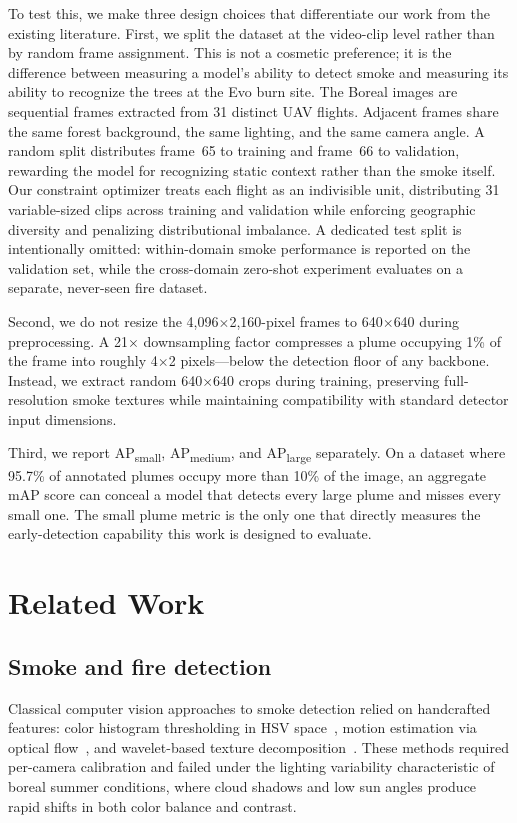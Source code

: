 \documentclass[10pt,twocolumn]{article}
\begin{document}
To test this, we make three design choices that differentiate our work from the existing literature. First, we split the dataset at the video-clip level rather than by random frame assignment. This is not a cosmetic preference; it is the difference between measuring a model's ability to detect smoke and measuring its ability to recognize the trees at the Evo burn site. The Boreal images are sequential frames extracted from 31 distinct UAV flights. Adjacent frames share the same forest background, the same lighting, and the same camera angle. A random split distributes frame~65 to training and frame~66 to validation, rewarding the model for recognizing static context rather than the smoke itself. Our constraint optimizer treats each flight as an indivisible unit, distributing 31 variable-sized clips across training and validation while enforcing geographic diversity and penalizing distributional imbalance. A dedicated test split is intentionally omitted: within-domain smoke performance is reported on the validation set, while the cross-domain zero-shot experiment evaluates on a separate, never-seen fire dataset.

Second, we do not resize the 4,096\(\times\)2,160-pixel frames to 640\(\times\)640 during preprocessing. A 21\(\times\) downsampling factor compresses a plume occupying 1\% of the frame into roughly 4\(\times\)2 pixels---below the detection floor of any backbone. Instead, we extract random 640\(\times\)640 crops during training, preserving full-resolution smoke textures while maintaining compatibility with standard detector input dimensions.

Third, we report AP\textsubscript{small}, AP\textsubscript{medium}, and AP\textsubscript{large} separately. On a dataset where 95.7\% of annotated plumes occupy more than 10\% of the image, an aggregate mAP score can conceal a model that detects every large plume and misses every small one. The small plume metric is the only one that directly measures the early-detection capability this work is designed to evaluate.

\section{Related Work}

\subsection{Smoke and fire detection}

Classical computer vision approaches to smoke detection relied on handcrafted features: color histogram thresholding in HSV space~\cite{toreyin2006fire}, motion estimation via optical flow~\cite{gubbi2009smoke}, and wavelet-based texture decomposition~\cite{toreyin2005wavelet}. These methods required per-camera calibration and failed under the lighting variability characteristic of boreal summer conditions, where cloud shadows and low sun angles produce rapid shifts in both color balance and contrast.
\end{document}
